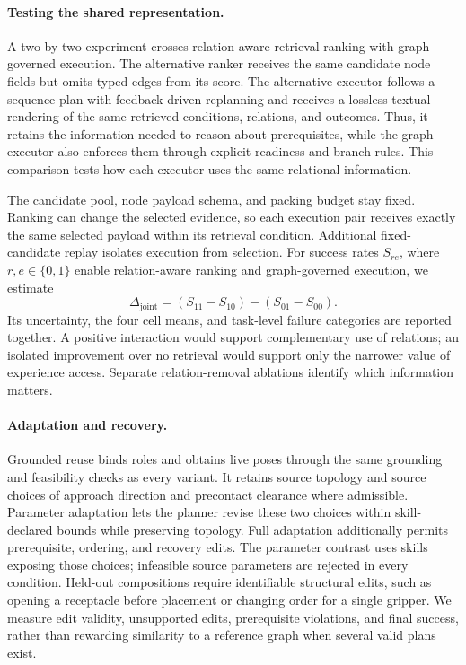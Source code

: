 \documentclass[10pt,twocolumn,letterpaper]{article}
\begin{document}
\paragraph{Testing the shared representation.}
A two-by-two experiment crosses relation-aware retrieval ranking with graph-governed execution. The alternative ranker receives the same candidate node fields but omits typed edges from its score. The alternative executor follows a sequence plan with feedback-driven replanning and receives a lossless textual rendering of the same retrieved conditions, relations, and outcomes. Thus, it retains the information needed to reason about prerequisites, while the graph executor also enforces them through explicit readiness and branch rules. This comparison tests how each executor uses the same relational information.

The candidate pool, node payload schema, and packing budget stay fixed. Ranking can change the selected evidence, so each execution pair receives exactly the same selected payload within its retrieval condition. Additional fixed-candidate replay isolates execution from selection. For success rates $S_{re}$, where $r,e\in\{0,1\}$ enable relation-aware ranking and graph-governed execution, we estimate
\begin{equation}
\Delta_{\mathrm{joint}}=(S_{11}-S_{10})-(S_{01}-S_{00}).
\end{equation}
Its uncertainty, the four cell means, and task-level failure categories are reported together. A positive interaction would support complementary use of relations; an isolated improvement over no retrieval would support only the narrower value of experience access. Separate relation-removal ablations identify which information matters.

\paragraph{Adaptation and recovery.}
Grounded reuse binds roles and obtains live poses through the same grounding and feasibility checks as every variant. It retains source topology and source choices of approach direction and precontact clearance where admissible. Parameter adaptation lets the planner revise these two choices within skill-declared bounds while preserving topology. Full adaptation additionally permits prerequisite, ordering, and recovery edits. The parameter contrast uses skills exposing those choices; infeasible source parameters are rejected in every condition. Held-out compositions require identifiable structural edits, such as opening a receptacle before placement or changing order for a single gripper. We measure edit validity, unsupported edits, prerequisite violations, and final success, rather than rewarding similarity to a reference graph when several valid plans exist.
\end{document}
